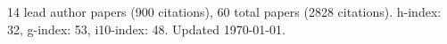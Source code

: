 14 lead author papers (900 citations),
60 total papers (2828 citations).\newline
h-index: 32, g-index: 53, i10-index: 48. Updated \today.